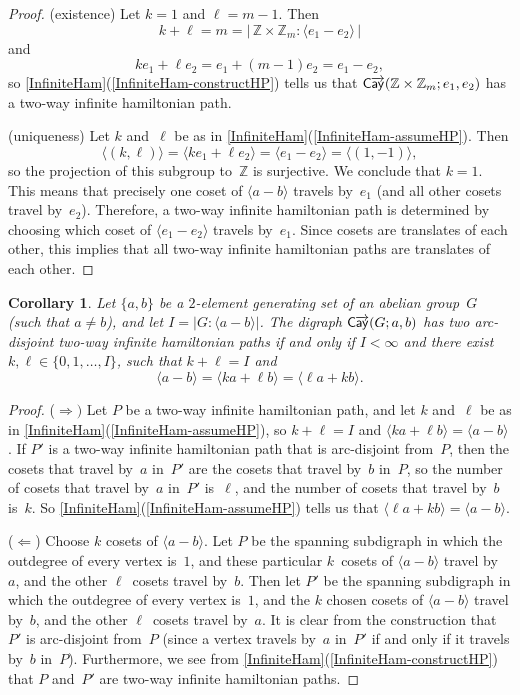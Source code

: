 \documentclass[11pt]{amsart}
\newtheorem{cor}[equation]{Corollary}
\newcommand{\fullcref}[2]{\cref{#1}(\ref{#1-#2})}
\theoremstyle{definition}
\numberwithin{case}{startcases}
\numberwithin{equation}{section}
\newcommand{\Z}{\mathbb{Z}}  %
\newcommand{\cayd}{\mathop{\mathsf{C}\mkern-1mu\overrightarrow{\mathsf{ay}}}}
\begin{document}
	\begin{proof}
		(existence) 
		Let $k = 1$ and $\ell = m - 1$. Then 
		\[ k + \ell = m = | \, \Z \times \Z_m : \langle e_1 - e_2 \rangle \,| \]
		and 
		\[ ke_1 + \ell e_2 = e_1 + (m - 1) e_2 = e_1 - e_2 , \]
		so \fullcref{InfiniteHam}{constructHP} tells us that $\cayd(\Z \times \Z_m;e_1,e_2)$ has a two-way infinite hamiltonian path.
		
		(uniqueness)
		Let $k$ and~$\ell$ be as in \fullcref{InfiniteHam}{assumeHP}. Then
		\[ \langle (k, \ell) \rangle
		= \langle k e_1 + \ell e_2 \rangle
		= \langle e_1 - e_2 \rangle
		= \langle (1, -1) \rangle
		, \]
		so the projection of this subgroup to~$\Z$ is surjective. We conclude that $k = 1$. This means that precisely one coset of $\langle a - b \rangle$ travels by~$e_1$ (and all other cosets travel by~$e_2$). Therefore, a two-way infinite hamiltonian path is determined by choosing which coset of $\langle e_1 - e_2 \rangle$ travels by~$e_1$. Since cosets are translates of each other, this implies that all two-way infinite hamiltonian paths are translates of each other.
	\end{proof}
	
	\begin{cor} \label{InfiniteADgeneral}
		Let $\{a,b\}$ be a $2$-element generating set of an abelian group~$G$ \textup(such that $a \neq b$\textup), and let $I = |G : \langle a - b \rangle|$. The digraph $\cayd(G; a,b)$ has two arc-disjoint two-way infinite hamiltonian paths if and only if $I < \infty$ and there exist $k, \ell \in \bigl\{ 0,1,\ldots, I \bigr\}$, such that $k + \ell = I$ and 
		\[ \langle a - b \rangle = \langle k a + \ell b \rangle = \langle \ell a + k b \rangle . \]
	\end{cor}
	
	\begin{proof}
		($\Rightarrow)$ Let $P$ be a two-way infinite hamiltonian path, and let $k$ and~$\ell$ be as in \fullcref{InfiniteHam}{assumeHP}, so $k + \ell = I$ and $\langle k a + \ell b \rangle = \langle a - b \rangle$. If $P'$ is a two-way infinite hamiltonian path that is arc-disjoint from~$P$, then the cosets that travel by~$a$ in~$P'$ are the cosets that travel by~$b$ in~$P$, so the number of cosets that travel by~$a$ in~$P'$ is~$\ell$, and the number of cosets that travel by~$b$ is~$k$. So \fullcref{InfiniteHam}{assumeHP} tells us that $\langle \ell a + k b \rangle = \langle a - b \rangle$.
		
		($\Leftarrow$) Choose $k$ cosets of $\langle a - b \rangle$. Let $P$ be the spanning subdigraph in which the outdegree of every vertex is~$1$, and these particular $k$~cosets of $\langle a - b \rangle$ travel by~$a$, and the other $\ell$~cosets travel by~$b$.  Then let $P'$ be the spanning subdigraph in which the outdegree of every vertex is~$1$, and the $k$ chosen cosets of $\langle a - b \rangle$ travel by~$b$, and the other $\ell$~cosets travel by~$a$. It is clear from the construction that $P'$ is arc-disjoint from~$P$ (since a vertex travels by~$a$ in~$P'$ if and only if it travels by~$b$ in~$P$). Furthermore, we see from \fullcref{InfiniteHam}{constructHP} that $P$ and~$P'$ are two-way infinite hamiltonian paths.
	\end{proof}
	
\end{document}
